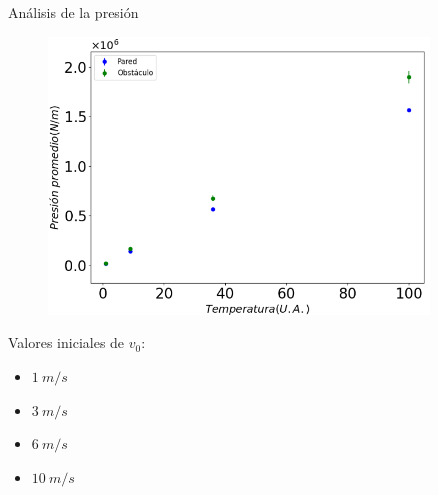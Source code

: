 \begin{frame}{Análisis de la presión}
    \begin{minipage}{0.75\textwidth}
        \begin{figure}[H]
            \centering
            \includegraphics[width=0.9\textwidth]{pic/1.1/vstemp}
            \label{fig:tempvsTemp}
        \end{figure}
    \end{minipage}
    \hfill
    \begin{minipage}{0.2\textwidth}
        Valores iniciales de $v_0$:
        \begin{itemize}
            \item $1\ m/s$
            \item $3\ m/s$
            \item $6\ m/s$
            \item $10\ m/s$
        \end{itemize}
    \end{minipage}
\end{frame}



